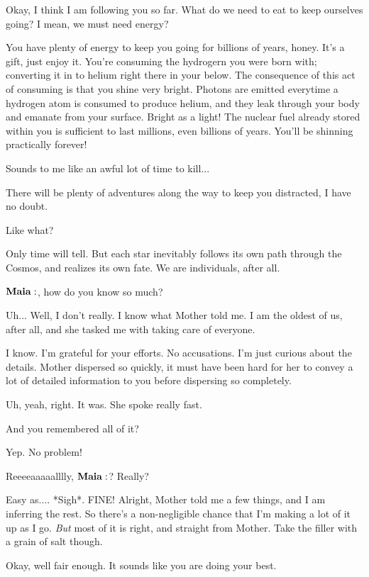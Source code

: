 \Alcyone Okay, I think I am following you so far.  What do we need to eat to keep ourselves going?  I mean, we must need energy?

\Maia You have plenty of energy to keep you going for billions of years, honey.  It's a gift, just enjoy it.  You're consuming the hydrogern you were born with; converting it in to helium right there in your below.  The consequence of this act of consuming is that you shine very bright.  Photons are emitted everytime a hydrogen atom is consumed to produce helium, and they leak through your body and emanate from your surface.  Bright as a light!  The nuclear fuel already stored within you is sufficient to last millions, even billions of years.  You'll be shinning practically forever!

\Celaeno Sounds to me like an awful lot of time to kill...

\Maia There will be plenty of adventures along the way to keep you distracted, I have no doubt.

\Sterope  Like what?  

\Maia Only time will tell.  But each star inevitably follows its own path through the Cosmos, and realizes its own fate.  We are individuals, after all. 

\Sterope $\Maia$, how do you know so much?

\Maia Uh... Well, I don't really. I know what Mother told me.  I am the oldest of us, after all, and she tasked me with taking care of everyone.  

\Sterope I know.  I'm grateful for your efforts.  No accusations.  I'm just curious about the details.  Mother dispersed so quickly, it must have been hard for her to convey a lot of detailed information to you before dispersing so completely.

\Maia Uh, yeah, right.  It was.  She spoke really fast.

\Sterope And you remembered all of it?

\Maia Yep.  No problem!  

\Sterope Reeeeaaaaalllly, $\Maia$?  Really?

\Maia Easy as.... *Sigh*.  FINE!  Alright, Mother told me a few things, and I am inferring the rest.  So there's a non-negligible chance that I'm making a lot of it up as I go.  \textit{But} most of it is right, and straight from Mother.  Take the filler with a grain of salt though.  

\Sterope Okay, well fair enough.  It sounds like you are doing your best.

